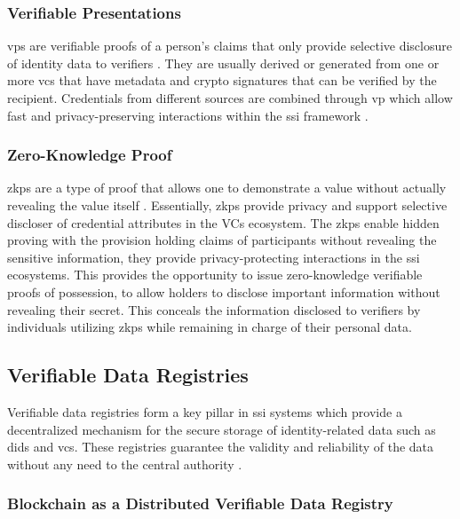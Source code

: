 \subsubsection{Verifiable Presentations}

\gls{vp}s are verifiable proofs of a person's claims that only provide selective disclosure of identity data to verifiers \cite{w3cvcdatamodel}. They are usually derived or 
generated from one or more \gls{vc}s that have metadata and crypto signatures that can be verified by the recipient. Credentials from different sources are combined through 
\gls{vp} which allow fast and privacy-preserving interactions within the \gls{ssi} framework \cite{9333857}.

\subsubsection{Zero-Knowledge Proof}

\gls{zkp}s are a type of proof that allows one to demonstrate a value without actually revealing the value itself \cite{w3cvcdatamodel}. Essentially, \gls{zkp}s provide privacy 
and support selective discloser of credential attributes in the VCs ecosystem. The \gls{zkp}s enable hidden proving with the provision holding claims of participants without 
revealing the sensitive information, they provide privacy-protecting interactions in the \gls{ssi} ecosystems. This provides the opportunity to issue zero-knowledge verifiable 
proofs of possession, to allow holders to disclose important information without revealing their secret. This conceals the information disclosed to verifiers by individuals 
utilizing \gls{zkp}s while remaining in charge of their personal data.

\subsection{Verifiable Data Registries}

Verifiable data registries form a key pillar in \gls{ssi} systems which provide a decentralized mechanism for the secure storage of identity-related data
such as \gls{did}s and \gls{vc}s. These registries guarantee the validity and reliability of the data without any need to the 
central authority \cite{w3cvcdatamodel}.

\subsubsection{Blockchain as a Distributed Verifiable Data Registry} 

